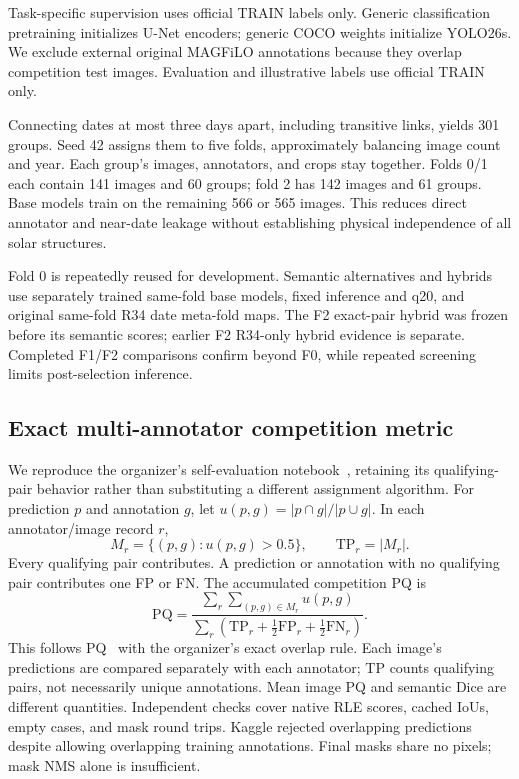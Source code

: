 \documentclass[sigconf]{acmart}
\newcommand{\PQ}{\mathrm{PQ}}
\begin{document}
Task-specific supervision uses official TRAIN labels only. Generic classification pretraining initializes U-Net encoders; generic COCO weights initialize YOLO26s. We exclude external original MAGFiLO annotations because they overlap competition test images. Evaluation and illustrative labels use official TRAIN only.

Connecting dates at most three days apart, including transitive links, yields 301 groups. Seed 42 assigns them to five folds, approximately balancing image count and year. Each group's images, annotators, and crops stay together. Folds 0/1 each contain 141 images and 60 groups; fold 2 has 142 images and 61 groups. Base models train on the remaining 566 or 565 images. This reduces direct annotator and near-date leakage without establishing physical independence of all solar structures.

Fold 0 is repeatedly reused for development. Semantic alternatives and hybrids use separately trained same-fold base models, fixed inference and q20, and original same-fold R34 date meta-fold maps. The F2 exact-pair hybrid was frozen before its semantic scores; earlier F2 R34-only hybrid evidence is separate. Completed F1/F2 comparisons confirm beyond F0, while repeated screening limits post-selection inference.

\subsection{Exact multi-annotator competition metric}
We reproduce the organizer's self-evaluation notebook~\cite{organizer}, retaining its qualifying-pair behavior rather than substituting a different assignment algorithm. For prediction $p$ and annotation $g$, let $u(p,g)=|p\cap g|/|p\cup g|$. In each annotator/image record $r$,
\begin{equation}
M_r=\{(p,g):u(p,g)>0.5\},\qquad \mathrm{TP}_r=|M_r|.
\end{equation}
Every qualifying pair contributes. A prediction or annotation with no qualifying pair contributes one FP or FN. The accumulated competition PQ is
\begin{equation}
\PQ=\frac{\sum_r\sum_{(p,g)\in M_r}u(p,g)}
{\sum_r(\mathrm{TP}_r+\tfrac12\mathrm{FP}_r+\tfrac12\mathrm{FN}_r)}.
\label{eq:pq}
\end{equation}
This follows PQ~\cite{kirillov2019panoptic} with the organizer's exact overlap rule. Each image's predictions are compared separately with each annotator; TP counts qualifying pairs, not necessarily unique annotations. Mean image PQ and semantic Dice are different quantities. Independent checks cover native RLE scores, cached IoUs, empty cases, and mask round trips. Kaggle rejected overlapping predictions despite allowing overlapping training annotations. Final masks share no pixels; mask NMS alone is insufficient.
\end{document}
